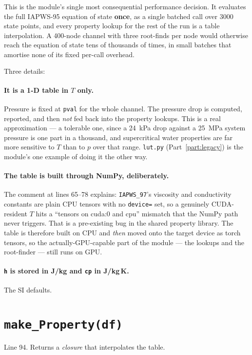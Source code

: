 \documentclass[11pt]{article}
\newcommand{\code}[1]{\texttt{#1}}
\begin{document}
This is the module's single most consequential performance decision. It evaluates the
full IAPWS-95 equation of state \textbf{once}, as a single batched call over 3000 state
points, and every property lookup for the rest of the run is a table interpolation. A
400-node channel with three root-finds per node would otherwise reach the equation of
state tens of thousands of times, in small batches that amortise none of its fixed
per-call overhead.

Three details:

\paragraph{It is a 1-D table in $T$ only.} Pressure is fixed at \code{pval} for the
whole channel. The pressure drop is computed, reported, and then \emph{not} fed back into
the property lookups. This is a real approximation --- a tolerable one, since a 24~kPa
drop against a 25~MPa system pressure is one part in a thousand, and supercritical water
properties are far more sensitive to $T$ than to $p$ over that range. \code{lut.py}
(Part~\ref{part:legacy}) is the module's one example of doing it the other way.

\paragraph{The table is built through NumPy, deliberately.} The comment at lines 65--78
explains: \code{IAPWS\_97}'s viscosity and conductivity constants are plain CPU tensors
with no \code{device=} set, so a genuinely CUDA-resident $T$ hits a ``tensors on cuda:0
and cpu'' mismatch that the NumPy path never triggers. That is a pre-existing bug in the
shared property library. The table is therefore built on CPU and \emph{then} moved onto
the target device as torch tensors, so the actually-GPU-capable part of the module ---
the lookups and the root-finder --- still runs on GPU.

\paragraph{\code{h} is stored in J/kg and \code{cp} in J/kg\,K.} The SI defaults.

\section{\code{make\_Property(df)}}
Line 94. Returns a \emph{closure} that interpolates the table.
\end{document}
